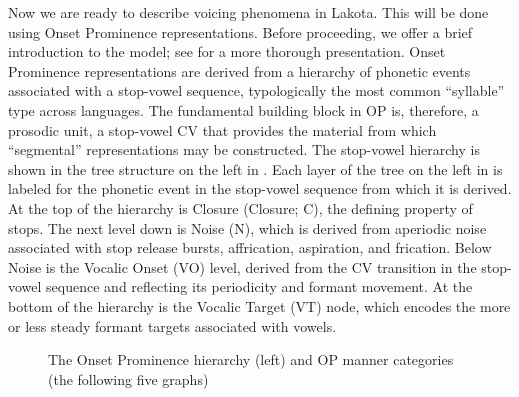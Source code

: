 \documentclass[output=paper]{langscibook}
\begin{document}
Now we are ready to describe voicing phenomena in Lakota. This will be done using Onset Prominence representations. Before proceeding, we offer a brief introduction to the model; see \citet{Schwartz2016,Schwartz2017} for a more thorough presentation. Onset Prominence representations are derived from a hierarchy of phonetic events associated with a stop-vowel sequence, typologically the most common “syllable” type across languages. The fundamental building block in OP is, therefore, a prosodic unit, a stop-vowel CV that provides the material from which “segmental” representations may be constructed. The stop-vowel hierarchy is shown in the tree structure on the left in . Each layer of the tree on the left in  is labeled for the phonetic event in the stop-vowel sequence from which it is derived. At the top of the hierarchy is Closure (Closure; C), the defining property of stops. The next level down is Noise (N), which is derived from aperiodic noise associated with stop release bursts, affrication, aspiration, and frication. Below Noise is the Vocalic Onset (VO) level, derived from the CV transition in the stop-vowel sequence and reflecting its periodicity and formant movement. At the bottom of the hierarchy is the Vocalic Target (VT) node, which encodes the more or less steady formant targets associated with vowels.

\begin{figure}
\caption{\label{exfig:schwartz:10} The Onset Prominence hierarchy (left) and OP manner categories (the following five graphs)}
\end{figure}
 
\end{document}
